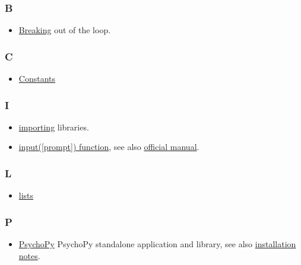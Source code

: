 \documentclass[
]{book}
\providecommand{\tightlist}{%
  \setlength{\itemsep}{0pt}\setlength{\parskip}{0pt}}
\begin{document}
\hypertarget{b}{%
\subsubsection*{B}\label{b}}

\begin{itemize}
\tightlist
\item
  \protect\hyperlink{break}{Breaking} out of the loop.
\end{itemize}

\hypertarget{c}{%
\subsubsection*{C}\label{c}}

\begin{itemize}
\tightlist
\item
  \protect\hyperlink{constants}{Constants}
\end{itemize}

\hypertarget{i}{%
\subsubsection*{I}\label{i}}

\begin{itemize}
\tightlist
\item
  \protect\hyperlink{import}{importing} libraries.
\item
  \protect\hyperlink{input-function}{input({[}prompt{]}) function}, see also \href{https://docs.python.org/3/library/functions.html\#input}{official manual}.
\end{itemize}

\hypertarget{l}{%
\subsubsection*{L}\label{l}}

\begin{itemize}
\tightlist
\item
  \protect\hyperlink{lists}{lists}
\end{itemize}

\hypertarget{p}{%
\subsubsection*{P}\label{p}}

\begin{itemize}
\tightlist
\item
  \href{https://www.psychopy.org/}{PsychoPy} PsychoPy standalone application and library, see also \protect\hyperlink{install-psychopy}{installation notes}.
\end{itemize}
\end{document}
